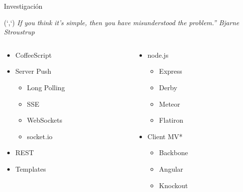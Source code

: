 \documentclass[xcolor=dvipsnames, 14pt]{beamer}
\newenvironment{reference}[2]{%
  \begin{textblock*}{\textwidth}(#1,#2)
      \footnotesize\it\bgroup\color{gray!50!black}}{\egroup\end{textblock*}}
\begin{document}
\begin{frame}{Investigación}
\begin{reference}{4mm}{13mm}
``If you think it's simple, then you have misunderstood the problem.'' Bjarne Stroustrup
\end{reference}

\begin{columns}

\begin{column}{0.5\textwidth}
    \begin{itemize}
    \item CoffeeScript
    \item Server Push
        \begin{itemize}
        \item Long Polling
        \item SSE
        \item WebSockets
        \item socket.io
        \end{itemize}
    \item REST
    \item Templates
    \end{itemize}
\end{column}

\begin{column}{0.5\textwidth}
    \begin{itemize}
    \item node.js
        \begin{itemize}
        \item Express
        \item Derby
        \item Meteor
        \item Flatiron
        \end{itemize}
    \item Client MV*
        \begin{itemize}
        \item Backbone
        \item Angular
        \item Knockout
        \end{itemize}
    \end{itemize}
\end{column}

\end{columns}

\end{frame}
\end{document}
